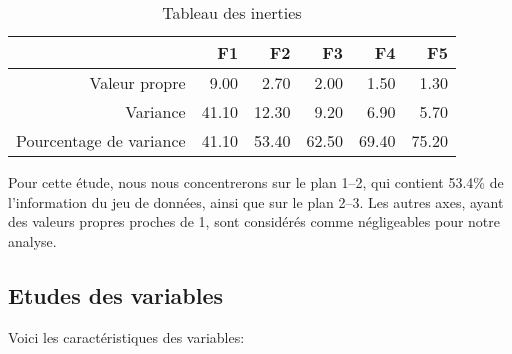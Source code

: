 \documentclass[a4paper,11pt]{article}
\begin{document}
\begin{center}
\begin{table}[ht]
\centering
\begin{tabular}{rrrrrr}
  \hline
 & F1 & F2 & F3 & F4 & F5 \\ 
  \hline
Valeur propre & 9.00 & 2.70 & 2.00 & 1.50 & 1.30 \\ 
  Variance & 41.10 & 12.30 & 9.20 & 6.90 & 5.70 \\ 
  Pourcentage de variance & 41.10 & 53.40 & 62.50 & 69.40 & 75.20 \\ 
   \hline
\end{tabular}
\caption{Tableau des inerties} 
\end{table}\end{center}

Pour cette étude, nous nous concentrerons sur le plan 1–2, qui contient 53.4\% de l’information du jeu de données, ainsi que sur le plan 2–3. Les autres axes, ayant des valeurs propres proches de 1, sont considérés comme négligeables pour notre analyse.

\subsection{Etudes des variables}

Voici les caractéristiques des variables:
\end{document}
